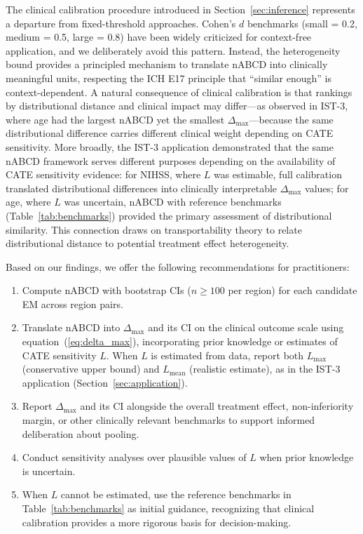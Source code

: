 \documentclass[AMA,Times1COL]{WileyNJDv5}
\begin{document}
The clinical calibration procedure introduced in Section~\ref{sec:inference} represents a departure from fixed-threshold approaches. Cohen's $d$ benchmarks (small = 0.2, medium = 0.5, large = 0.8) have been widely criticized for context-free application, and we deliberately avoid this pattern. Instead, the heterogeneity bound provides a principled mechanism to translate nABCD into clinically meaningful units, respecting the ICH E17 principle that ``similar enough'' is context-dependent. A natural consequence of clinical calibration is that rankings by distributional distance and clinical impact may differ---as observed in IST-3, where age had the largest nABCD yet the smallest $\Delta_{\max}$---because the same distributional difference carries different clinical weight depending on CATE sensitivity. More broadly, the IST-3 application demonstrated that the same nABCD framework serves different purposes depending on the availability of CATE sensitivity evidence: for NIHSS, where $L$ was estimable, full calibration translated distributional differences into clinically interpretable $\Delta_{\max}$ values; for age, where $L$ was uncertain, nABCD with reference benchmarks (Table~\ref{tab:benchmarks}) provided the primary assessment of distributional similarity. This connection draws on transportability theory\cite{pearl2011,bareinboim2016} to relate distributional distance to potential treatment effect heterogeneity.

Based on our findings, we offer the following recommendations for practitioners:
\begin{enumerate}[1.]
\item Compute nABCD with bootstrap CIs ($n \geq 100$ per region) for each candidate EM across region pairs.
\item Translate nABCD into $\Delta_{\max}$ and its CI on the clinical outcome scale using equation~(\ref{eq:delta_max}), incorporating prior knowledge or estimates of CATE sensitivity $L$. When $L$ is estimated from data, report both $L_{\max}$ (conservative upper bound) and $L_{\text{mean}}$ (realistic estimate), as in the IST-3 application (Section~\ref{sec:application}).
\item Report $\Delta_{\max}$ and its CI alongside the overall treatment effect, non-inferiority margin, or other clinically relevant benchmarks to support informed deliberation about pooling.
\item Conduct sensitivity analyses over plausible values of $L$ when prior knowledge is uncertain.
\item When $L$ cannot be estimated, use the reference benchmarks in Table~\ref{tab:benchmarks} as initial guidance, recognizing that clinical calibration provides a more rigorous basis for decision-making.
\end{enumerate}
\end{document}
